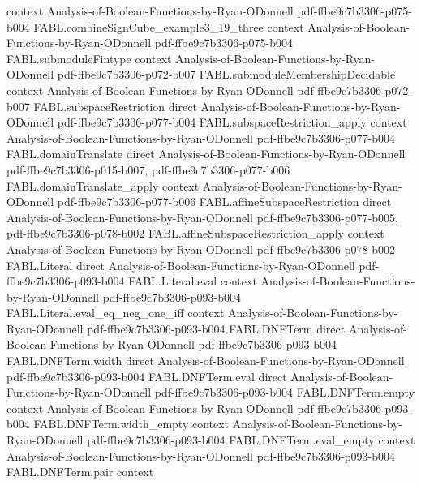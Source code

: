 \begin{theorem}
  {context}
  {Analysis-of-Boolean-Functions-by-Ryan-ODonnell}
  {pdf-ffbe9c7b3306-p075-b004}
\proofstep
  {FABL.combineSignCube_example3_19_three}
  {context}
  {Analysis-of-Boolean-Functions-by-Ryan-ODonnell}
  {pdf-ffbe9c7b3306-p075-b004}
\proofstep
  {FABL.submoduleFintype}
  {context}
  {Analysis-of-Boolean-Functions-by-Ryan-ODonnell}
  {pdf-ffbe9c7b3306-p072-b007}
\proofstep
  {FABL.submoduleMembershipDecidable}
  {context}
  {Analysis-of-Boolean-Functions-by-Ryan-ODonnell}
  {pdf-ffbe9c7b3306-p072-b007}
\proofstep
  {FABL.subspaceRestriction}
  {direct}
  {Analysis-of-Boolean-Functions-by-Ryan-ODonnell}
  {pdf-ffbe9c7b3306-p077-b004}
\proofstep
  {FABL.subspaceRestriction_apply}
  {context}
  {Analysis-of-Boolean-Functions-by-Ryan-ODonnell}
  {pdf-ffbe9c7b3306-p077-b004}
\proofstep
  {FABL.domainTranslate}
  {direct}
  {Analysis-of-Boolean-Functions-by-Ryan-ODonnell}
  {pdf-ffbe9c7b3306-p015-b007,
    pdf-ffbe9c7b3306-p077-b006}
\proofstep
  {FABL.domainTranslate_apply}
  {context}
  {Analysis-of-Boolean-Functions-by-Ryan-ODonnell}
  {pdf-ffbe9c7b3306-p077-b006}
\proofstep
  {FABL.affineSubspaceRestriction}
  {direct}
  {Analysis-of-Boolean-Functions-by-Ryan-ODonnell}
  {pdf-ffbe9c7b3306-p077-b005,
    pdf-ffbe9c7b3306-p078-b002}
\proofstep
  {FABL.affineSubspaceRestriction_apply}
  {context}
  {Analysis-of-Boolean-Functions-by-Ryan-ODonnell}
  {pdf-ffbe9c7b3306-p078-b002}
\proofstep
  {FABL.Literal}
  {direct}
  {Analysis-of-Boolean-Functions-by-Ryan-ODonnell}
  {pdf-ffbe9c7b3306-p093-b004}
\proofstep
  {FABL.Literal.eval}
  {context}
  {Analysis-of-Boolean-Functions-by-Ryan-ODonnell}
  {pdf-ffbe9c7b3306-p093-b004}
\proofstep
  {FABL.Literal.eval_eq_neg_one_iff}
  {context}
  {Analysis-of-Boolean-Functions-by-Ryan-ODonnell}
  {pdf-ffbe9c7b3306-p093-b004}
\proofstep
  {FABL.DNFTerm}
  {direct}
  {Analysis-of-Boolean-Functions-by-Ryan-ODonnell}
  {pdf-ffbe9c7b3306-p093-b004}
\proofstep
  {FABL.DNFTerm.width}
  {direct}
  {Analysis-of-Boolean-Functions-by-Ryan-ODonnell}
  {pdf-ffbe9c7b3306-p093-b004}
\proofstep
  {FABL.DNFTerm.eval}
  {direct}
  {Analysis-of-Boolean-Functions-by-Ryan-ODonnell}
  {pdf-ffbe9c7b3306-p093-b004}
\proofstep
  {FABL.DNFTerm.empty}
  {context}
  {Analysis-of-Boolean-Functions-by-Ryan-ODonnell}
  {pdf-ffbe9c7b3306-p093-b004}
\proofstep
  {FABL.DNFTerm.width_empty}
  {context}
  {Analysis-of-Boolean-Functions-by-Ryan-ODonnell}
  {pdf-ffbe9c7b3306-p093-b004}
\proofstep
  {FABL.DNFTerm.eval_empty}
  {context}
  {Analysis-of-Boolean-Functions-by-Ryan-ODonnell}
  {pdf-ffbe9c7b3306-p093-b004}
\proofstep
  {FABL.DNFTerm.pair}
  {context}

\end{theorem}
